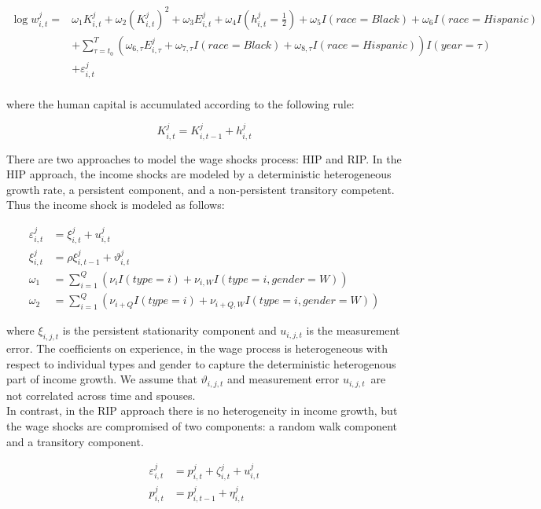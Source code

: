 \begin{align*}
\log w_{i,t}^j = & \omega_1 K_{i,t}^j + \omega_2 (K_{i,t}^j)^2 + \omega_3 E_{i,t}^j + \omega_4 I(h_{i,t} ^j = \frac{1}{2}) +   \omega_5 I(race = Black) + \omega_6 I(race = Hispanic) \\
& + \sum \limits_{\tau =t_0}^{T}  \left ( \omega_{6,\tau} E_{i, \tau}^j + \omega_{7, \tau} I(race = Black) + \omega_{8, \tau} I(race = Hispanic) \right )I(year = \tau)  \\
& + \varepsilon^j_{i,t} \\
\end{align*}

where the human capital is accumulated according to the following rule:

\begin{equation*}
K_{i,t}^j = K_{i,t-1}^j + h_{i,t}^j
\end{equation*}


There are two approaches to model the wage shocks process: HIP and RIP. In the HIP approach, the income shocks are modeled by a deterministic heterogeneous growth rate, a persistent  component, and a non-persistent transitory competent. Thus the income shock is modeled as follows:

\begin{align*}
\varepsilon^j_{i,t} & = \xi^j_{i,t} + u^j_{i,t}\\
\xi^j_{i,t} &= \rho \xi^j_{i,t-1} + \vartheta^j_{i,t} \\
\omega_1 &=  \sum \limits_{i=1}^{Q} \left( \nu_{i} I(type =i) + \nu_{i,W}  I(type = i, gender = W)\right ) \\
\omega_2 &=  \sum \limits_{i=1}^{Q} \left( \nu_{i+Q} I(type =i) + \nu_{i+Q,W}  I(type = i, gender = W)\right )
\end{align*}

where $\xi_{i,j,t}$ is the persistent stationarity component and $u_{i,j,t}$ is the measurement error. The coefficients on experience, in the wage process is heterogeneous with respect to individual types and gender to capture the deterministic heterogenous part of income growth.  We assume that $\vartheta_{i,j,t}$ and measurement error $u_{i,j,t}$\ are not correlated across time and spouses.\\

In contrast, in the RIP approach there is no heterogeneity in income growth, but the wage shocks are compromised of two components: a random walk component and a transitory component. 

\begin{align*}
\varepsilon^j_{i,t} &= p^j_{i,t} + \zeta^j_{i,t} + u^j_{i,t} \\
p^j_{i,t} &= p^j_{i,t-1} + \eta^j_{i,t}
\end{align*} 

